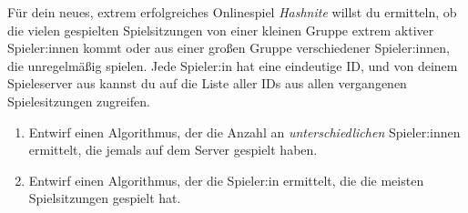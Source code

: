 \documentclass{uebung_cs}
\begin{document}
\begin{aufgabe}[Spielserverstatistiken]
	Für dein neues, extrem erfolgreiches Onlinespiel \emph{Hashnite} willst du ermitteln, ob die vielen gespielten Spielsitzungen von einer kleinen Gruppe extrem aktiver Spieler:innen kommt oder aus einer großen Gruppe verschiedener Spieler:innen, die unregelmäßig spielen.
	Jede Spieler:in hat eine eindeutige ID, und von deinem Spieleserver aus kannst du auf die Liste aller IDs aus allen vergangenen Spielesitzungen zugreifen.
	\begin{enumerate}
		\item Entwirf einen Algorithmus, der die Anzahl an \emph{unterschiedlichen} Spieler:innen ermittelt, die jemals auf dem Server gespielt haben.
		\item Entwirf einen Algorithmus, der die Spieler:in ermittelt, die die meisten Spielsitzungen gespielt hat.
	\end{enumerate}
\end{aufgabe}
\end{document}
